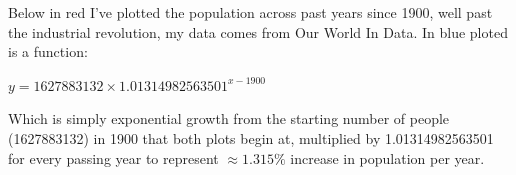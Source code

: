 \documentclass{article}
\begin{document}
	
	\medskip
	
	Below in red I've plotted the population across past years since 1900, well past the industrial revolution, my data comes from Our World In Data. In blue ploted is a function:
	
	\begin{center}
		{\large $ y = 1627883132 \times 1.01314982563501^{x-1900} $}
	\end{center}
	
	Which is simply exponential growth from the starting number of people (1627883132) in 1900 that both plots begin at, multiplied by 1.01314982563501 for every passing year to represent $\approx 1.315\%$ increase in population per year.
	
	\bigskip
	
\end{document}
